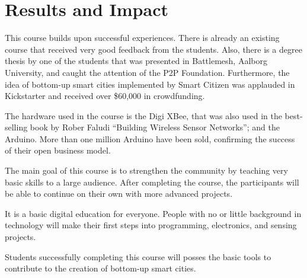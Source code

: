 \documentclass{tufte-book} %
\begin{document}

\chapter{Results and Impact}

This course builds upon successful experiences. There is already an existing course that received very good feedback from the students. Also, there is a degree thesis by one of the students that was presented in Battlemesh, Aalborg University, and caught the attention of the P2P Foundation. Furthermore, the idea of bottom-up smart cities implemented by Smart Citizen was applauded in Kickstarter and received over \$60,000 in crowdfunding. 

The hardware used in the course is the Digi XBee, that was also used in the best-selling book by Rober Faludi ``Building Wireless Sensor Networks''; and the Arduino. More than one million Arduino have been sold, confirming the success of their open business model.

The main goal of this course is to strengthen the community by teaching very basic skills to a large audience. After completing the course, the participants will be able to continue on their own with more advanced projects. 

It is a basic digital education for everyone. People with no or little background in technology will make their first steps into programming, electronics, and sensing projects.

Students successfully completing this course will posses the basic tools to contribute to the creation of bottom-up smart cities.

% 
% 
% 
\end{document}
